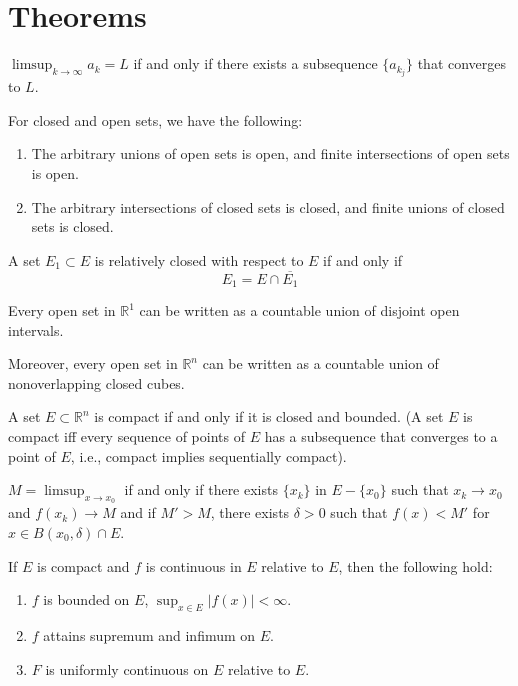 \documentclass[openany]{book}
\newcommand{\R}{\mathbb{R}}
\begin{document}
\chapter{Theorems}
\begin{prop}
    $\limsup_{k\to\infty}a_k=L$ if and only if there exists a subsequence $\{a_{k_j}\}$ that converges to $L$.
\end{prop}
\begin{prop}
    For closed and open sets, we have the following:
    \begin{enumerate}
        \item The arbitrary unions of open sets is open, and finite intersections of open sets is open.
        \item The arbitrary intersections of closed sets is closed, and finite unions of closed sets is closed.
    \end{enumerate}
\end{prop}
\begin{prop}
    A set $E_1\subset E$ is relatively closed with respect to $E$ if and only if
    \begin{equation*}
        E_1=E\cap \overline{E_1}
    \end{equation*}
\end{prop}
\begin{prop}
    Every open set in $\R^1$ can be written as a countable union of disjoint open intervals.

    Moreover, every open set in $\R^n$ can be written as a countable union of nonoverlapping closed cubes. 
\end{prop}
\begin{thm}
    A set $E\subset\R^n$ is compact if and only if it is closed and bounded. (A set $E$ is compact iff every sequence of points of $E$ has a subsequence that converges to a point of $E$, i.e., compact implies sequentially compact).
\end{thm}
\begin{prop}
    $M=\limsup_{x\to x_0}$ if and only if there exists $\{x_k\}$ in $E-\{x_0\}$ such that $x_k\to x_0$ and $f(x_k)\to M$ and if $M'>M$, there exists $\delta>0$ such that $f(x)<M'$ for $x\in B(x_0,\delta)\cap E$.
\end{prop}
\begin{thm}
    If $E$ is compact and $f$ is continuous in $E$ relative to $E$, then the following hold:
    \begin{enumerate}
        \item $f$ is bounded on $E$, $\sup_{x\in E}|f(x)|<\infty$.
        \item $f$ attains supremum and infimum on $E$.
        \item $F$ is uniformly continuous on $E$ relative to $E$.
    \end{enumerate}
\end{thm}
\end{document}
